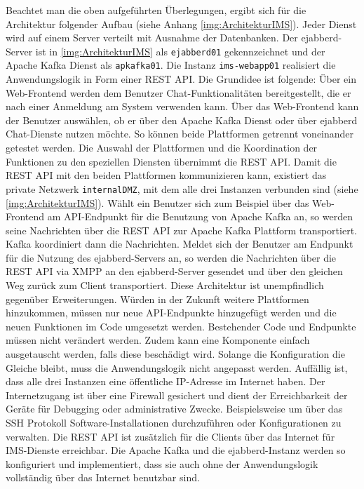 \documentclass[a4paper,titlepage,halfparskip,12pt]{scrreprt}
\begin{document}
\begin{onehalfspacing}
Beachtet man die oben aufgeführten Überlegungen, ergibt sich für die Architektur folgender Aufbau (siehe Anhang \autoref{img:ArchitekturIMS}).
Jeder Dienst wird auf einem Server verteilt mit Ausnahme der Datenbanken. Der ejabberd-Server ist in \autoref{img:ArchitekturIMS} als \texttt{ejabberd01} gekennzeichnet und der Apache Kafka Dienst als \texttt{apkafka01}. Die Instanz \texttt{ims-webapp01} realisiert die Anwendungslogik in Form einer \acs{REST} \acs{API}. Die Grundidee ist folgende: Über ein Web-Frontend werden dem Benutzer Chat-Funktionalitäten bereitgestellt, die er nach einer Anmeldung am System verwenden kann. Über das Web-Frontend kann der Benutzer auswählen, ob er über den Apache Kafka Dienst oder über ejabberd Chat-Dienste nutzen möchte. So können beide Plattformen getrennt voneinander getestet werden. Die Auswahl der Plattformen und die Koordination der Funktionen zu den speziellen Diensten übernimmt die \acs{REST} \acs{API}. Damit die \acs{REST} \acs{API} mit den beiden Plattformen kommunizieren kann, existiert das private Netzwerk \texttt{internalDMZ}, mit dem alle drei Instanzen verbunden sind (siehe \autoref{img:ArchitekturIMS}). Wählt ein Benutzer sich zum Beispiel über das Web-Frontend am \acs{API}-Endpunkt für die Benutzung von Apache Kafka an, so werden seine Nachrichten über die \acs{REST} \acs{API} zur Apache Kafka Plattform transportiert. Kafka koordiniert dann die Nachrichten. Meldet sich der Benutzer am Endpunkt für die Nutzung des ejabberd-Servers an, so werden die Nachrichten über die \acs{REST} \acs{API} via \ac{XMPP} an den ejabberd-Server gesendet und über den gleichen Weg zurück zum Client transportiert. Diese Architektur ist unempfindlich gegenüber Erweiterungen. Würden in der Zukunft weitere Plattformen hinzukommen, müssen nur neue \acs{API}-Endpunkte hinzugefügt werden und die neuen Funktionen im Code umgesetzt werden. Bestehender Code und Endpunkte müssen nicht verändert werden. Zudem kann eine Komponente einfach ausgetauscht werden, falls diese beschädigt wird. Solange die Konfiguration die Gleiche bleibt, muss die Anwendungslogik nicht angepasst werden. Auffällig ist, dass alle drei Instanzen eine öffentliche IP-Adresse im Internet haben. Der Internetzugang ist über eine Firewall gesichert und dient der Erreichbarkeit der Geräte für Debugging oder administrative Zwecke. Beispielsweise um über das \ac{SSH} Protokoll Software-Installationen durchzuführen oder Konfigurationen zu verwalten. Die \acs{REST} \acs{API} ist zusätzlich für die Clients über das Internet für \ac{IMS}-Dienste erreichbar. Die Apache Kafka und die ejabberd-Instanz werden so konfiguriert und implementiert, dass sie auch ohne der Anwendungslogik vollständig über das Internet benutzbar sind.


\end{onehalfspacing}
\end{document}
